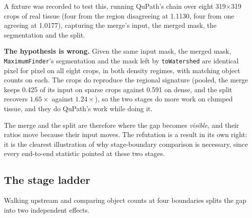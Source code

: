 \documentclass[11pt,a4paper]{article}
\begin{document}
A fixture was recorded to test this, running QuPath's chain over eight
319$\times$319 crops of real tissue (four from the region disagreeing at
1.1130, four from one agreeing at 1.0177), capturing the merge's input, the
merged mask, the segmentation and the split.

\textbf{The hypothesis is wrong.} Given the same input mask, the merged mask,
\texttt{MaximumFinder}'s segmentation and the mask left by \texttt{toWatershed}
are identical pixel for pixel on all eight crops, in both density regimes, with
matching object counts on each. The crops do reproduce the regional signature
(pooled, the merge keeps 0.425 of its input on sparse crops against 0.591 on
dense, and the split recovers $1.65\times$ against $1.24\times$), so the two
stages do more work on clumped tissue, and they do QuPath's work while doing
it.

The merge and the split are therefore where the gap becomes \emph{visible}, and
their ratios move because their input moves. The refutation is a result in its
own right: it is the clearest illustration of why stage-boundary comparison is
necessary, since every end-to-end statistic pointed at these two stages.

\subsection{The stage ladder}

Walking upstream and comparing object counts at four boundaries splits the gap
into two independent effects.
\end{document}
